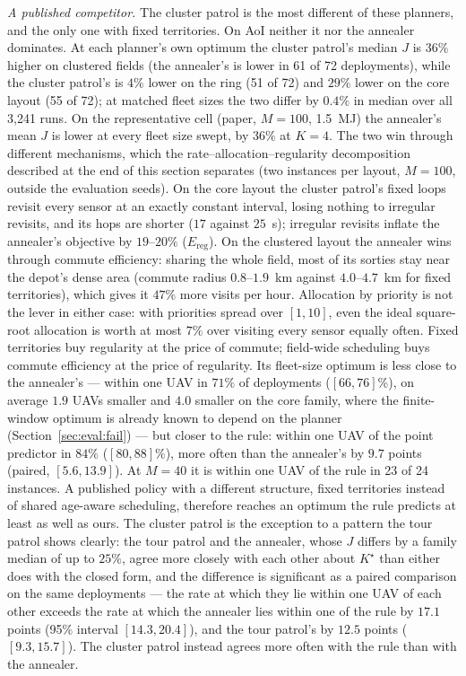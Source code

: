 \documentclass[journal,outdir=./]{IEEEtran}
\begin{document}
\textit{A published competitor.} The cluster patrol is the most different of these planners, and the only one with fixed territories. On AoI neither it nor the annealer dominates. At each planner's own optimum the cluster patrol's median $J$ is $36\%$ higher on clustered fields (the annealer's is lower in 61 of 72 deployments), while the cluster patrol's is $4\%$ lower on the ring (51 of 72) and $29\%$ lower on the core layout (55 of 72); at matched fleet sizes the two differ by $0.4\%$ in median over all 3{,}241 runs. On the representative cell (paper, $M=100$, 1.5~MJ) the annealer's mean $J$ is lower at every fleet size swept, by $36\%$ at $K=4$. The two win through different mechanisms, which the rate--allocation--regularity decomposition described at the end of this section separates (two instances per layout, $M=100$, outside the evaluation seeds). On the core layout the cluster patrol's fixed loops revisit every sensor at an exactly constant interval, losing nothing to irregular revisits, and its hops are shorter ($17$ against $25$~s); irregular revisits inflate the annealer's objective by $19$--$20\%$ ($E_{\mathrm{reg}}$). On the clustered layout the annealer wins through commute efficiency: sharing the whole field, most of its sorties stay near the depot's dense area (commute radius $0.8$--$1.9$~km against $4.0$--$4.7$~km for fixed territories), which gives it $47\%$ more visits per hour. Allocation by priority is not the lever in either case: with priorities spread over $[1,10]$, even the ideal square-root allocation is worth at most $7\%$ over visiting every sensor equally often. Fixed territories buy regularity at the price of commute; field-wide scheduling buys commute efficiency at the price of regularity. Its fleet-size optimum is less close to the annealer's --- within one UAV in $71\%$ of deployments ($[66,76]\%$), on average $1.9$ UAVs smaller and $4.0$ smaller on the core family, where the finite-window optimum is already known to depend on the planner (Section~\ref{sec:eval:fail}) --- but closer to the rule: within one UAV of the point predictor in $84\%$ ($[80,88]\%$), more often than the annealer's by $9.7$ points (paired, $[5.6,13.9]$). At $M=40$ it is within one UAV of the rule in 23 of 24 instances. A published policy with a different structure, fixed territories instead of shared age-aware scheduling, therefore reaches an optimum the rule predicts at least as well as ours. The cluster patrol is the exception to a pattern the tour patrol shows clearly: the tour patrol and the annealer, whose $J$ differs by a family median of up to $25\%$, agree more closely with each other about $K^{\star}$ than either does with the closed form, and the difference is significant as a paired comparison on the same deployments --- the rate at which they lie within one UAV of each other exceeds the rate at which the annealer lies within one of the rule by $17.1$ points (95\% interval $[14.3,20.4]$), and the tour patrol's by $12.5$ points ($[9.3,15.7]$). The cluster patrol instead agrees more often with the rule than with the annealer.
\end{document}
